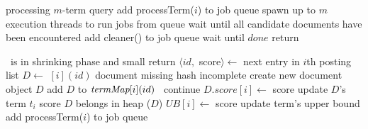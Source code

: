 
\begin{algorithm*}[htb]
\begin{multicols}{2}
\begin{algorithmic}[1]
 \Comment processing $m$-term query
\State add {\sc processTerm($i$)} to job queue \label{l:par-init-job}
\EndFor
\State spawn up to $m$ execution threads to run jobs from queue\label{l:start-threads}
\State wait until \RAStop
\State \Comment all candidate documents have been  encountered
\State add {\sc cleaner()} to job queue %
\State wait until $done$
\State return \DHeap \label{l:par-end}
%

\Statex 
{} 
	\If{\RAStop\, $\wedge\, |\DMap | < \Phi $}  
		\State \Comment \DMap\ is in shrinking phase and small
		\If{\TMap[i]=\DMap} \label{l:hash-start}
  	\EndIf \EndIf \label{l:hash-end}
    \Statex
		 return \EndIf
    		\State $\langle id,$ score$\rangle \leftarrow$ next entry in $i$th posting list
		\State $D \leftarrow$ \TMap$[i](id)$
 	  		 \Comment document missing 
 	  			\If{$\neg$\RAStop} \Comment hash incomplete
		 			\State create new document object $D$
 					\State add $D$ to $\textit{termMap}[i](id)$
				\Else\ continue
				\EndIf
    			\EndIf
        			\State $D.score[i] \leftarrow$ score \Comment update $D$'s term $t_i$ score
			\State \Comment $D$ belongs in heap
				($D$)
			\EndIf	
	\EndFor %
	\State $UB[i] \leftarrow$ score \Comment update term's upper bound \label{l:thread-update-ub}    
	\State add {\sc processTerm($i$)} to job queue \label{l:new-task}
\EndProcedure



\end{algorithmic}
\end{multicols}
\end{algorithm*}
